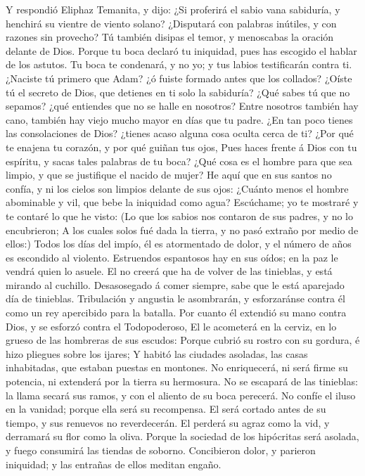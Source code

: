  Y respondió Eliphaz Temanita, y dijo:  ¿Si
proferirá el sabio vana sabiduría, y henchirá su vientre de viento
solano?  ¿Disputará con palabras inútiles, y con razones sin
provecho?  Tú también disipas el temor, y menoscabas la
oración delante de Dios.  Porque tu boca declaró tu
iniquidad, pues has escogido el hablar de los astutos.  Tu
boca te condenará, y no yo; y tus labios testificarán contra ti.
 ¿Naciste tú primero que Adam? ¿ó fuiste formado antes que
los collados?  ¿Oíste tú el secreto de Dios, que detienes en
ti solo la sabiduría?  ¿Qué sabes tú que no sepamos? ¿qué
entiendes que no se halle en nosotros?  Entre nosotros
también hay cano, también hay viejo mucho mayor en días que tu padre.
 ¿En tan poco tienes las consolaciones de Dios? ¿tienes
acaso alguna cosa oculta cerca de ti?  ¿Por qué te enajena
tu corazón, y por qué guiñan tus ojos,  Pues haces frente á
Dios con tu espíritu, y sacas tales palabras de tu boca? 
¿Qué cosa es el hombre para que sea limpio, y que se justifique el
nacido de mujer?  He aquí que en sus santos no confía, y ni
los cielos son limpios delante de sus ojos:  ¿Cuánto menos
el hombre abominable y vil, que bebe la iniquidad como agua?
 Escúchame; yo te mostraré y te contaré lo que he visto:
 (Lo que los sabios nos contaron de sus padres, y no lo
encubrieron;  A los cuales solos fué dada la tierra, y no
pasó extraño por medio de ellos:)  Todos los días del
impío, él es atormentado de dolor, y el número de años es escondido al
violento.  Estruendos espantosos hay en sus oídos; en la
paz le vendrá quien lo asuele.  El no creerá que ha de
volver de las tinieblas, y está mirando al cuchillo. 
Desasosegado á comer siempre, sabe que le está aparejado día de
tinieblas.  Tribulación y angustia le asombrarán, y
esforzaránse contra él como un rey apercibido para la batalla.
 Por cuanto él extendió su mano contra Dios, y se esforzó
contra el Todopoderoso,  El le acometerá en la cerviz, en
lo grueso de las hombreras de sus escudos:  Porque cubrió
su rostro con su gordura, é hizo pliegues sobre los ijares;
 Y habitó las ciudades asoladas, las casas inhabitadas, que
estaban puestas en montones.  No enriquecerá, ni será firme
su potencia, ni extenderá por la tierra su hermosura.  No
se escapará de las tinieblas: la llama secará sus ramos, y con el
aliento de su boca perecerá.  No confíe el iluso en la
vanidad; porque ella será su recompensa.  El será cortado
antes de su tiempo, y sus renuevos no reverdecerán.  El
perderá su agraz como la vid, y derramará su flor como la oliva.
 Porque la sociedad de los hipócritas será asolada, y fuego
consumirá las tiendas de soborno.  Concibieron dolor, y
parieron iniquidad; y las entrañas de ellos meditan engaño.

